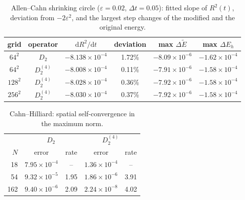 \documentclass[11pt]{article}
\begin{document}
\begin{table}[htbp]\centering\small
\caption{Allen--Cahn shrinking circle ($\varepsilon=0.02$, $\Delta t=0.05$): fitted slope of $R^2(t)$, deviation from $-2\varepsilon^2$, and the largest step changes of the modified and the original energy.}
\begin{tabular}{cc cccc}
\toprule
grid & operator & $\mathrm dR^2/\mathrm dt$ & deviation & max $\Delta\tilde E$ & max $\Delta E_h$\\
\midrule
$64^2$ & $D_2$ & $-8.138{\times}10^{-4}$ & 1.72\% & $-8.09{\times}10^{-6}$ & $-1.62{\times}10^{-4}$\\
$64^2$ & $D_2^{(4)}$ & $-8.008{\times}10^{-4}$ & 0.11\% & $-7.91{\times}10^{-6}$ & $-1.58{\times}10^{-4}$\\
$128^2$ & $D_2^{(4)}$ & $-8.028{\times}10^{-4}$ & 0.36\% & $-7.92{\times}10^{-6}$ & $-1.58{\times}10^{-4}$\\
$256^2$ & $D_2^{(4)}$ & $-8.030{\times}10^{-4}$ & 0.37\% & $-7.92{\times}10^{-6}$ & $-1.58{\times}10^{-4}$\\
\bottomrule
\end{tabular}
\end{table}

\clearpage
\begin{table}[htbp]\centering\small
\caption{Cahn--Hilliard: spatial self-convergence in the maximum norm.}
\begin{tabular}{r cc cc}
\toprule
& \multicolumn{2}{c}{$D_2$} & \multicolumn{2}{c}{$D_2^{(4)}$}\\
$N$ & error & rate & error & rate\\
\midrule
18 & $7.95{\times}10^{-4}$ & -- & $1.36{\times}10^{-4}$ & --\\
54 & $9.32{\times}10^{-5}$ & 1.95 & $1.86{\times}10^{-6}$ & 3.91\\
162 & $9.40{\times}10^{-6}$ & 2.09 & $2.24{\times}10^{-8}$ & 4.02\\
\bottomrule
\end{tabular}
\end{table}
\end{document}
